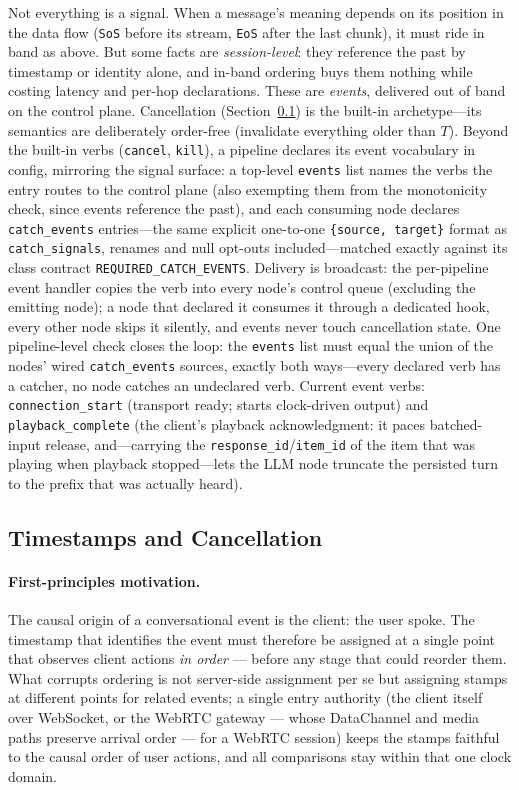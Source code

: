 \documentclass[11pt,a4paper]{article}
\begin{document}
Not everything is a signal. When a message's meaning depends on its position in the data flow (\texttt{SoS} before its stream, \texttt{EoS} after the last chunk), it must ride in band as above. But some facts are \emph{session-level}: they reference the past by timestamp or identity alone, and in-band ordering buys them nothing while costing latency and per-hop declarations. These are \emph{events}, delivered out of band on the control plane. Cancellation (Section~\ref{sec:cancel}) is the built-in archetype---its semantics are deliberately order-free (invalidate everything older than $T$). Beyond the built-in verbs (\texttt{cancel}, \texttt{kill}), a pipeline declares its event vocabulary in config, mirroring the signal surface: a top-level \texttt{events} list names the verbs the entry routes to the control plane (also exempting them from the monotonicity check, since events reference the past), and each consuming node declares \texttt{catch\_events} entries---the same explicit one-to-one \texttt{\{source, target\}} format as \texttt{catch\_signals}, renames and null opt-outs included---matched exactly against its class contract \texttt{REQUIRED\_CATCH\_EVENTS}. Delivery is broadcast: the per-pipeline event handler copies the verb into every node's control queue (excluding the emitting node); a node that declared it consumes it through a dedicated hook, every other node skips it silently, and events never touch cancellation state. One pipeline-level check closes the loop: the \texttt{events} list must equal the union of the nodes' wired \texttt{catch\_events} sources, exactly both ways---every declared verb has a catcher, no node catches an undeclared verb. Current event verbs: \texttt{connection\_start} (transport ready; starts clock-driven output) and \texttt{playback\_complete} (the client's playback acknowledgment: it paces batched-input release, and---carrying the \texttt{response\_id}/\texttt{item\_id} of the item that was playing when playback stopped---lets the LLM node truncate the persisted turn to the prefix that was actually heard).

\subsection{Timestamps and Cancellation}
\label{sec:cancel}

\paragraph{First-principles motivation.}
The causal origin of a conversational event is the client: the user spoke. The timestamp that identifies the event must therefore be assigned at a single point that observes client actions \emph{in order} --- before any stage that could reorder them. What corrupts ordering is not server-side assignment per se but assigning stamps at different points for related events; a single entry authority (the client itself over WebSocket, or the WebRTC gateway --- whose DataChannel and media paths preserve arrival order --- for a WebRTC session) keeps the stamps faithful to the causal order of user actions, and all comparisons stay within that one clock domain.
\end{document}
